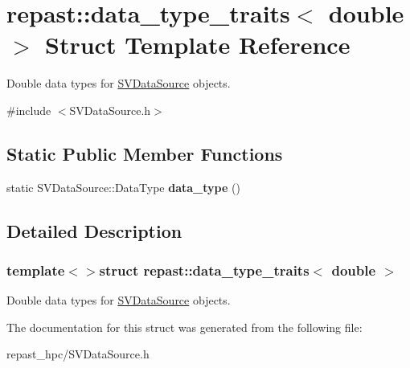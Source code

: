 \hypertarget{structrepast_1_1data__type__traits_3_01double_01_4}{\section{repast\-:\-:data\-\_\-type\-\_\-traits$<$ double $>$ Struct Template Reference}
\label{structrepast_1_1data__type__traits_3_01double_01_4}
}


Double data types for \hyperlink{classrepast_1_1_s_v_data_source}{S\-V\-Data\-Source} objects.  




{\ttfamily \#include $<$S\-V\-Data\-Source.\-h$>$}

\subsection*{Static Public Member Functions}
\begin{DoxyCompactItemize}
\item 
\hypertarget{structrepast_1_1data__type__traits_3_01double_01_4_a396c5e415a3b8b2ce0732860237e3d61}{static S\-V\-Data\-Source\-::\-Data\-Type {\bfseries data\-\_\-type} ()}\label{structrepast_1_1data__type__traits_3_01double_01_4_a396c5e415a3b8b2ce0732860237e3d61}

\end{DoxyCompactItemize}


\subsection{Detailed Description}
\subsubsection*{template$<$$>$struct repast\-::data\-\_\-type\-\_\-traits$<$ double $>$}

Double data types for \hyperlink{classrepast_1_1_s_v_data_source}{S\-V\-Data\-Source} objects. 

The documentation for this struct was generated from the following file\-:\begin{DoxyCompactItemize}
\item 
repast\-\_\-hpc/S\-V\-Data\-Source.\-h\end{DoxyCompactItemize}
